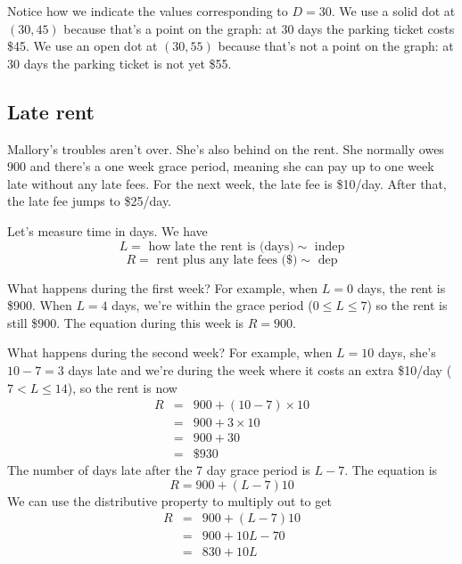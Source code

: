 Notice how we indicate the values corresponding to $D=30$.  We use a solid dot at $(30,45)$ because that's a point on the graph: at 30 days the parking ticket costs \$45.  We use an open dot at $(30,55)$ because that's not a point on the graph: at 30 days the parking ticket is not yet \$55. 

\subsection*{Late rent}

Mallory's troubles aren't over.  She's also behind on the rent.  She normally owes $900$ and there's a one week grace period, meaning she can pay up to one week late without any late fees.  For the next week, the late fee is \$10/day.  After that, the late fee jumps to \$25/day. 

Let's measure time in days. We have
$$L = \text{ how late the rent is (days)} \sim \text{ indep}$$
$$R = \text{ rent plus any late fees (\$)} \sim \text{ dep}$$

What happens during the first week?  For example, when $L=0$ days, the rent is \$900.  When $L=4$ days, we're within the grace period ($0 \le L \le 7$) so the rent is still \$900.  The equation during this week is $R = 900$.

What happens during the second week?  For example, when $L = 10$ days, she's $10-7=3$ days late and we're during the week where it costs an extra \$10/day ($7<L\le14$), so the rent is now 
\begin{eqnarray*}
  R & = & 900 + (10-7)\times 10 \\
  & = & 900 + 3\times 10 \\
  & = & 900 + 30 \\
  & = & \$930  
\end{eqnarray*}
The number of days late after the 7 day grace period is $L-7$.  The equation is 
$$R = 900 + (L-7)10$$
We can use the distributive property to multiply out to get
\begin{eqnarray*}
    R & = & 900 + (L-7)10 \\
    & = & 900+10L - 70 \\
    & = & 830+10L
\end{eqnarray*}

